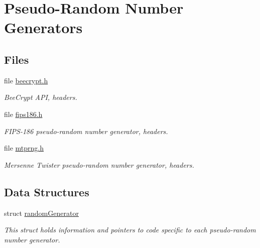 \hypertarget{group__PRNG__m}{
\section{Pseudo-Random Number Generators}
\label{group__PRNG__m}
}
\subsection*{Files}
\begin{CompactItemize}
\item 
file \hyperlink{beecrypt_8h}{beecrypt.h}
\begin{CompactList}\small\item\em Bee\-Crypt API, headers. \item\end{CompactList}

\item 
file \hyperlink{fips186_8h}{fips186.h}
\begin{CompactList}\small\item\em FIPS-186 pseudo-random number generator, headers. \item\end{CompactList}

\item 
file \hyperlink{mtprng_8h}{mtprng.h}
\begin{CompactList}\small\item\em Mersenne Twister pseudo-random number generator, headers. \item\end{CompactList}

\end{CompactItemize}
\subsection*{Data Structures}
\begin{CompactItemize}
\item 
struct \hyperlink{structrandomGenerator}{random\-Generator}
\begin{CompactList}\small\item\em This struct holds information and pointers to code specific to each pseudo-random number generator. \item\end{CompactList}\end{CompactItemize}
